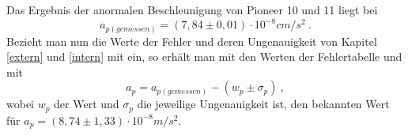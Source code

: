 \noindent Das Ergebnis der anormalen Beschleunigung von Pioneer 10 und 11 liegt
bei\cite{Anderson2002}
\begin{equation}
a_{p(\mathit{gemessen})}=(7,84\pm 0,01)\cdot
10^{-8}\mathit{cm}/s^{2}\ .
\end{equation}
Bezieht man nun die Werte der Fehler und deren Ungenauigkeit von Kapitel
\ref{extern} und \ref{intern} mit ein, so erh\"alt man mit den Werten der Fehlertabelle
und mit
\begin{equation}
a_{p}=a_{p(\mathit{gemessen})}-(w_{p}\pm \sigma _{p}) \ ,
\end{equation}
wobei $w_{p}$ der Wert und $\sigma _{p}$ die jeweilige Ungenauigkeit
ist, den bekannten Wert f\"ur $a_{p}=(8,74\pm 1,33)\cdot
10^{-8}m/s^{2}$.

\FloatBarrier